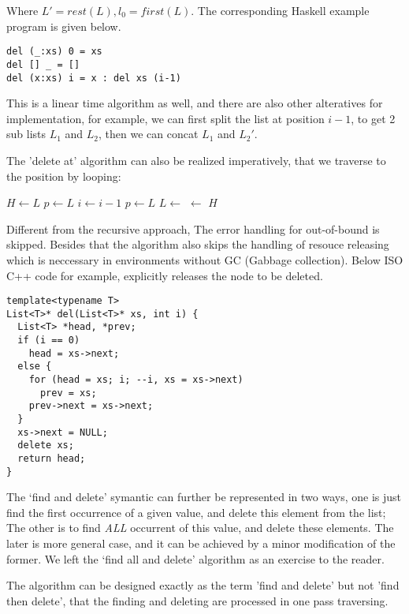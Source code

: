 \documentclass{article}
\begin{document}
Where $L' = rest(L), l_0 = first(L)$. The corresponding Haskell example program is given below.

\lstset{language=Haskell}
\begin{lstlisting}
del (_:xs) 0 = xs
del [] _ = []
del (x:xs) i = x : del xs (i-1)
\end{lstlisting}

This is a linear time algorithm as well, and there are also other alteratives for implementation, for example, we can 
first split the list at position $i-1$, to get 2 sub lists $L_1$ and $L_2$, then we can concat $L_1$ and $L_2'$.

The 'delete at' algorithm can also be realized imperatively, that we traverse to the position by looping:

\begin{algorithmic}
    \State \Return {}
  \EndIf
  \State $H \gets L$
  \State $p \gets L$
    \State $i \gets i - 1$
    \State $p \gets L$
    \State $L \gets $ 
  \EndWhile
  \State {} $\gets$ 
  \State \Return $H$
\EndFunction
\end{algorithmic}

Different from the recursive approach, The error handling for out-of-bound is skipped. Besides that the algorithm 
also skips the handling of resouce releasing which is neccessary in environments without GC (Gabbage collection).
Below ISO C++ code for example, explicitly releases the node to be deleted.

\lstset{language=C++}
\begin{lstlisting}
template<typename T>
List<T>* del(List<T>* xs, int i) {
  List<T> *head, *prev;
  if (i == 0)
    head = xs->next;
  else {
    for (head = xs; i; --i, xs = xs->next)
      prev = xs;
    prev->next = xs->next;
  }
  xs->next = NULL;
  delete xs;
  return head;
}
\end{lstlisting}

The `find and delete' symantic can further be represented in two ways, one is just find the first occurrence of a
given value, and delete this element from the list; The other is to find {\em ALL} occurrent of this value, and 
delete these elements. The later is more general case, and it can be achieved by a minor modification of the
former. We left the `find all and delete' algorithm as an exercise to the reader.

The algorithm can be designed exactly as the term 'find and delete' but not 'find then delete', that the finding
and deleting are processed in one pass traversing.
\end{document}
